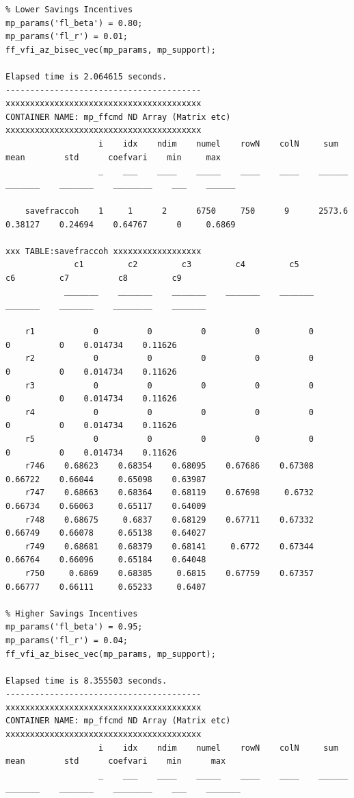 \documentclass[
]{book}
\begin{document}
\begin{verbatim}
% Lower Savings Incentives
mp_params('fl_beta') = 0.80;
mp_params('fl_r') = 0.01;
ff_vfi_az_bisec_vec(mp_params, mp_support);

Elapsed time is 2.064615 seconds.
----------------------------------------
xxxxxxxxxxxxxxxxxxxxxxxxxxxxxxxxxxxxxxxx
CONTAINER NAME: mp_ffcmd ND Array (Matrix etc)
xxxxxxxxxxxxxxxxxxxxxxxxxxxxxxxxxxxxxxxx
                   i    idx    ndim    numel    rowN    colN     sum       mean        std      coefvari    min     max  
                   _    ___    ____    _____    ____    ____    ______    _______    _______    ________    ___    ______

    savefraccoh    1     1      2      6750     750      9      2573.6    0.38127    0.24694    0.64767      0     0.6869

xxx TABLE:savefraccoh xxxxxxxxxxxxxxxxxx
              c1         c2         c3         c4         c5         c6         c7          c8         c9   
            _______    _______    _______    _______    _______    _______    _______    ________    _______

    r1            0          0          0          0          0          0          0    0.014734    0.11626
    r2            0          0          0          0          0          0          0    0.014734    0.11626
    r3            0          0          0          0          0          0          0    0.014734    0.11626
    r4            0          0          0          0          0          0          0    0.014734    0.11626
    r5            0          0          0          0          0          0          0    0.014734    0.11626
    r746    0.68623    0.68354    0.68095    0.67686    0.67308    0.66722    0.66044     0.65098    0.63987
    r747    0.68663    0.68364    0.68119    0.67698     0.6732    0.66734    0.66063     0.65117    0.64009
    r748    0.68675     0.6837    0.68129    0.67711    0.67332    0.66749    0.66078     0.65138    0.64027
    r749    0.68681    0.68379    0.68141     0.6772    0.67344    0.66764    0.66096     0.65184    0.64048
    r750     0.6869    0.68385     0.6815    0.67759    0.67357    0.66777    0.66111     0.65233     0.6407

% Higher Savings Incentives
mp_params('fl_beta') = 0.95;
mp_params('fl_r') = 0.04;
ff_vfi_az_bisec_vec(mp_params, mp_support);

Elapsed time is 8.355503 seconds.
----------------------------------------
xxxxxxxxxxxxxxxxxxxxxxxxxxxxxxxxxxxxxxxx
CONTAINER NAME: mp_ffcmd ND Array (Matrix etc)
xxxxxxxxxxxxxxxxxxxxxxxxxxxxxxxxxxxxxxxx
                   i    idx    ndim    numel    rowN    colN     sum       mean        std      coefvari    min      max  
                   _    ___    ____    _____    ____    ____    ______    _______    _______    ________    ___    _______


\end{verbatim}
\end{document}
